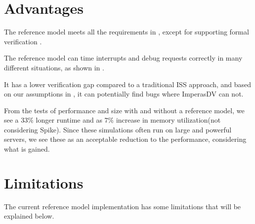 %


\section{Advantages}

The reference model meets all the requirements in , except for supporting formal verification .

The reference model can time interrupts and debug requests correctly in many different situations, as shown in .

It has a lower verification gap compared to a traditional ISS approach, and based on our assumptions in , it can potentially find bugs where ImperasDV can not.

From the tests of performance and size with and without a reference model, we see a  $33\%$ longer runtime and as $7\%$ increase in memory utilization(not considering Spike). Since these simulations often run on large and powerful servers, we see these as an acceptable reduction to the performance, considering what is gained.


\section{Limitations}
\label{sec:discuss_limitations}

The current reference model implementation has some limitations that will be explained below.




